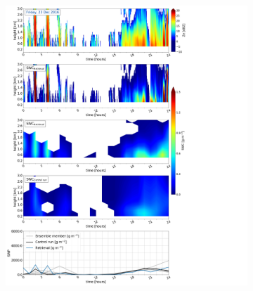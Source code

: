     \begin{figure}\ContinuedFloat
   		\centering
		\begin{subfigure}[b]{0.8\textwidth}
			\includegraphics[trim={0.5cm 0.5cm 17.5cm .5cm},clip,width=\textwidth]{./fig_SWC/20161223}
			\caption{}\label{fig:SWC23}
		\end{subfigure}
	\end{figure}
